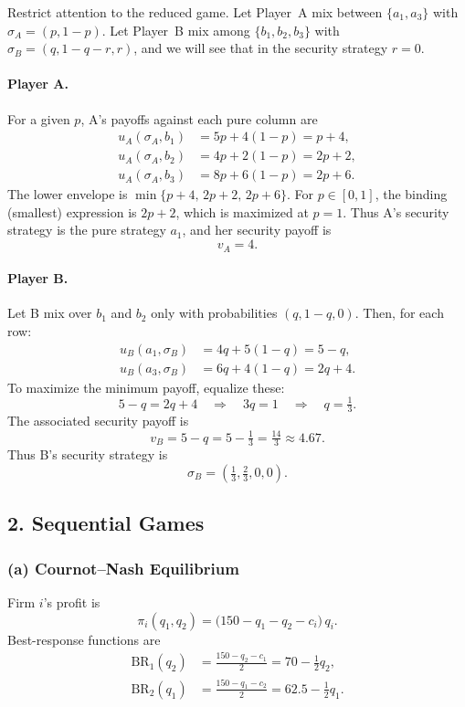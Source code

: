 \documentclass[12pt,a4paper]{article}
\begin{document}
Restrict attention to the reduced game. Let Player~A mix between \(\{a_1,a_3\}\) with
\(\sigma_A = (p,1-p)\). Let Player~B mix among \(\{b_1,b_2,b_3\}\) with
\(\sigma_B = (q,1-q-r,r)\), and we will see that in the security strategy \(r = 0\).

\paragraph{Player A.}
For a given \(p\), A's payoffs against each pure column are
\begin{align*}
  u_A(\sigma_A,b_1) &= 5p + 4(1-p) = p + 4, \\
  u_A(\sigma_A,b_2) &= 4p + 2(1-p) = 2p + 2, \\
  u_A(\sigma_A,b_3) &= 8p + 6(1-p) = 2p + 6.
\end{align*}
The lower envelope is \(\min\{p+4,\,2p+2,\,2p+6\}\). For \(p \in [0,1]\), the binding (smallest)
expression is \(2p + 2\), which is maximized at \(p = 1\). Thus A's security strategy is the pure
strategy \(a_1\), and her security payoff is
\[
  v_A = 4.
\]

\paragraph{Player B.}
Let B mix over \(b_1\) and \(b_2\) only with probabilities \((q,1-q,0)\). Then, for each row:
\begin{align*}
  u_B(a_1,\sigma_B) &= 4q + 5(1-q) = 5 - q, \\
  u_B(a_3,\sigma_B) &= 6q + 4(1-q) = 2q + 4.
\end{align*}
To maximize the minimum payoff, equalize these:
\[
  5 - q = 2q + 4
  \quad\Longrightarrow\quad
  3q = 1
  \quad\Longrightarrow\quad
  q = \tfrac{1}{3}.
\]
The associated security payoff is
\[
  v_B = 5 - q = 5 - \tfrac{1}{3} = \tfrac{14}{3} \approx 4.67.
\]
Thus B's security strategy is
\[
  \sigma_B = \left(\tfrac{1}{3}, \tfrac{2}{3}, 0, 0\right).
\]

\bigskip

\subsection*{2. Sequential Games}

\subsubsection*{(a) Cournot--Nash Equilibrium}

Firm \(i\)'s profit is
\[
  \pi_i(q_1,q_2) = \bigl(150 - q_1 - q_2 - c_i\bigr)\, q_i.
\]
Best-response functions are
\begin{align*}
  \text{BR}_1(q_2) &= \frac{150 - q_2 - c_1}{2}
                   = 70 - \tfrac{1}{2}q_2, \\
  \text{BR}_2(q_1) &= \frac{150 - q_1 - c_2}{2}
                   = 62.5 - \tfrac{1}{2}q_1.
\end{align*}
\end{document}
